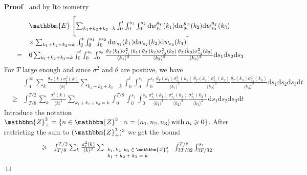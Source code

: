 \documentclass[11pt]{article}
\newcommand{\mathd}{\mathrm{d}}
\newcommand{\tmop}[1]{\ensuremath{\operatorname{#1}}}
\newcommand{\tmscript}[1]{\text{\scriptsize{$#1$}}}
\newenvironment{proof}{\noindent\textbf{Proof\ }}{\hspace*{\fill}$\Box$\medskip}
\begin{document}
\begin{proof}
  and by Ito isometry
  \[ \begin{array}{lll}
       &  & \mathbbm{E} \left. \Biggl[ \sum_{k_1 + k_2 + k_3 = k} \int^t_0
       \int^{s_1}_0 \int^{s_2}_0 \mathd w_{s_1}^{\theta_T} (k_1) \mathd
       w_{s_2}^{\theta_T} (k_2) \mathd w^{\theta_T}_{s_3} (k_3)  \right.\\
       &  & \times \sum_{k_1 + k_2 + k_3 = k} \left. \int^t_0 \int^{s_1}_0
       \int^{s_2}_0 \mathd w_{s_1} (k_1) \mathd w_{s_2} (k_2) \mathd w_{s_3}
       (k_3) \right]\\
       & = & 6 \sum_{k_1 + k_2 + k_3 = k} \int^t_0 \int^{s_1}_0 \int^{s_2}_0
       \frac{\theta_T (k_1) \sigma^2_{s_1} (k_1)}{\langle k_1 \rangle^2}
       \frac{\theta_T (k_2) \sigma^2_{s_2} (k_2)}{\langle k_2 \rangle^2}
       \frac{\theta_T (k_3) \sigma^2_{s_3} (k_3)}{\langle k_3 \rangle^2}
       \mathd s_1 \mathd s_2 \mathd s_3
     \end{array} \]
  For $T$ large enough and since $\sigma^2$ and $\theta$ are positive, we have
 {\footnotesize
 \[ \begin{array}{lll}
    &  & \int^{\infty}_0 \sum_k \frac{\theta_T (k) \sigma^2_t (k)}{\langle k
    \rangle^2} \sum_{k_1 + k_2 + k_3 = k} \int^t_0 \int^{s_1}_0 \int^{s_2}_0
    \frac{\theta_T (k_1) \sigma^2_{s_1} (k_1)}{\langle k_1 \rangle^2}
    \frac{\theta_T (k_2) \sigma^2_{s_2} (k_2)}{\langle k_2 \rangle^2}
    \frac{\theta_T (k_3) \sigma^2_{s_3} (k_3)}{\langle k_3 \rangle^2} \mathd
    s_1 \mathd s_2 \mathd s_3 \mathd t\\
    & \geqslant & \int^{T / 2}_{T / 8} \sum_k \frac{\sigma^2_t (k)}{\langle k
    \rangle^2} \sum_{k_1 + k_2 + k_3 = k} \int^{T / 8}_0 \int^{s_1}_0
    \int^{s_2}_0 \frac{\sigma^2_{s_1} (k_1)}{\langle k_1 \rangle^2}
    \frac{\sigma^2_{s_2} (k_2)}{\langle k_2 \rangle^2} \frac{\sigma^2_{s_3}
    (k_3)}{\langle k_3 \rangle^2} \mathd s_1 \mathd s_2 \mathd s_3 \mathd t
  \end{array}\]}
  Introduce the notation $\mathbbm{Z}_+^3 = \{ n \in \mathbbm{Z}^3 : n = (n_1,
  n_2, n_3) \tmop{with} n_i \geqslant 0 \}$. After restricting the sum to
  $(\mathbbm{Z}_+^3)^3$ we get the bound
   {\footnotesize \[
  \begin{array}{ll}
       \geqslant & \int^{T / 2}_{T / 8} \sum_k \frac{\sigma^2_t (k)}{\langle k
       \rangle^2} \sum_{\tmscript{\begin{array}{l}
         k_1, k_2, k_3 \in \mathbbm{Z}_+^3\\
         k_1 + k_2 + k_3 = k
       \end{array}}} \int^{T / 8}_{3 T / 32} \int^{s_1}_{3 T / 32}

\end{array}\]}
\end{proof}
\end{document}
